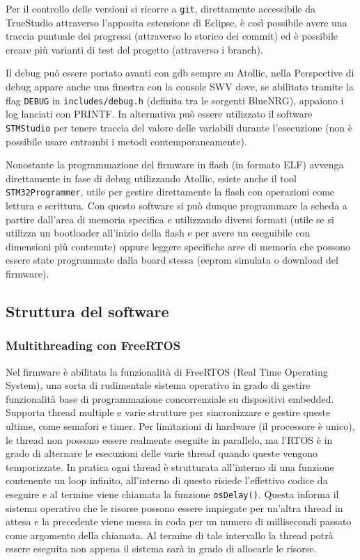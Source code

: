 Per il controllo delle versioni si ricorre a \texttt{git}, direttamente accessibile da TrueStudio attraverso l'apposita estensione di Eclipse, \`e cos\`i possibile avere una traccia puntuale dei progressi (attraverso lo storico dei commit) ed \`e possibile creare pi\`u varianti di test del progetto (attraverso i branch).

Il debug pu\`o essere portato avanti con gdb sempre su Atollic, nella Perspective di debug appare anche una finestra con la console SWV dove, se abilitato tramite la flag \texttt{DEBUG} in \texttt{includes/debug.h} (definita tra le sorgenti BlueNRG), appaiono i log lanciati con PRINTF. In alternativa pu\`o essere utilizzato il software \texttt{STMStudio} per tenere traccia del valore delle variabili durante l'esecuzione (non \`e possibile usare entrambi i metodi contemporaneamente).

Nonostante la programmazione del firmware in flash (in formato ELF) avvenga direttamente in fase di debug utilizzando Atollic, esiste anche il tool \texttt{STM32Programmer}, utile per gestire direttamente la flash con operazioni come lettura e scrittura. Con questo software si pu\`o dunque programmare la scheda a partire dall'area di memoria specifica e utilizzando diversi formati (utile se si utilizza un bootloader all'inizio della flash e per avere un eseguibile con dimensioni pi\`u contenute) oppure leggere specifiche aree di memoria che possono essere state programmate dalla board stessa (eeprom simulata o download del firmware).

\subsection{Struttura del software}

\subsubsection{Multithreading con FreeRTOS}

Nel firmware \`e abilitata la funzionalit\`a di FreeRTOS (Real Time Operating System), una sorta di rudimentale sistema operativo in grado di gestire funzionalit\`a base di programmazione concorrenziale su dispositivi embedded. Supporta thread multiple e varie strutture per sincronizzare e gestire queste ultime, come semafori e timer. Per limitazioni di hardware (il processore \`e unico), le thread non possono essere realmente eseguite in parallelo, ma l'RTOS \`e in grado di alternare le esecuzioni delle varie thread quando queste vengono temporizzate. In pratica ogni thread \`e strutturata all'interno di una funzione contenente un loop infinito, all'interno di questo risiede l'effettivo codice da eseguire e al termine viene chiamata la funzione \texttt{osDelay()}. Questa informa il sistema operativo che le risorse possono essere impiegate per un'altra thread in attesa e la precedente viene messa in coda per un numero di millisecondi passato come argomento della chiamata. Al termine di tale intervallo la thread potr\`a essere eseguita non appena il sistema sar\`a in grado di allocarle le risorse.

